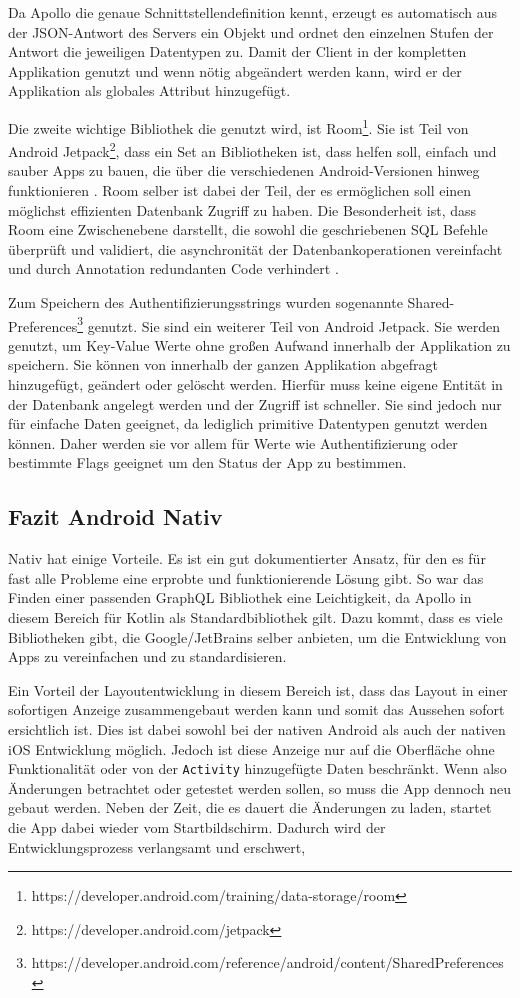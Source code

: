 Da Apollo die genaue Schnittstellendefinition kennt, erzeugt es automatisch aus der \ac{JSON}-Antwort des Servers ein Objekt und ordnet den einzelnen Stufen der Antwort die jeweiligen Datentypen zu.
Damit der Client in der kompletten Applikation genutzt und wenn nötig abgeändert werden kann, wird er der Applikation als globales Attribut hinzugefügt.

Die zweite wichtige Bibliothek die genutzt wird, ist Room\footnote{https://developer.android.com/training/data-storage/room}. Sie ist Teil von Android Jetpack\footnote{https://developer.android.com/jetpack}, dass ein Set an Bibliotheken ist, dass helfen soll, einfach und sauber Apps zu bauen, die über die verschiedenen Android-Versionen hinweg funktionieren \cite{Jetpack_android}. Room selber ist dabei der Teil, der es ermöglichen soll einen möglichst effizienten Datenbank Zugriff zu haben. 
Die Besonderheit ist, dass Room eine Zwischenebene darstellt, die sowohl die geschriebenen SQL Befehle überprüft und validiert, die asynchronität der Datenbankoperationen vereinfacht und durch Annotation redundanten Code verhindert \cite{Room_docs}.

Zum Speichern des Authentifizierungsstrings wurden sogenannte Shared-Preferences\footnote{https://developer.android.com/reference/android/content/SharedPreferences} genutzt. Sie sind ein weiterer Teil von Android Jetpack. Sie werden genutzt, um Key-Value Werte ohne großen Aufwand innerhalb der Applikation zu speichern. Sie können von innerhalb der ganzen Applikation abgefragt hinzugefügt, geändert oder gelöscht werden. Hierfür muss keine eigene Entität in der Datenbank angelegt werden und der Zugriff ist schneller. Sie sind jedoch nur für einfache Daten geeignet, da lediglich primitive Datentypen genutzt werden können. Daher werden sie vor allem für Werte wie Authentifizierung oder bestimmte Flags geeignet um den Status der App zu bestimmen.


\subsection{Fazit Android Nativ}
Nativ hat einige Vorteile. Es ist ein gut dokumentierter Ansatz, für den es für fast alle Probleme eine erprobte und funktionierende Lösung gibt. So war das Finden einer passenden GraphQL Bibliothek eine Leichtigkeit, da Apollo in diesem Bereich für Kotlin als Standardbibliothek gilt. Dazu kommt, dass es viele Bibliotheken gibt, die Google/JetBrains selber anbieten, um die Entwicklung von Apps zu vereinfachen und zu standardisieren.

Ein Vorteil der Layoutentwicklung in diesem Bereich ist, dass das Layout in einer sofortigen Anzeige zusammengebaut werden kann und somit das Aussehen sofort ersichtlich ist. Dies ist dabei sowohl bei der nativen Android als auch der nativen iOS Entwicklung möglich. Jedoch ist diese Anzeige nur auf die Oberfläche ohne Funktionalität oder von der \verb|Activity| hinzugefügte Daten beschränkt. Wenn also Änderungen betrachtet oder getestet werden sollen, so muss die App dennoch neu gebaut werden. Neben der Zeit, die es dauert die Änderungen zu laden, startet die App dabei wieder vom Startbildschirm. Dadurch wird der Entwicklungsprozess verlangsamt und erschwert,
